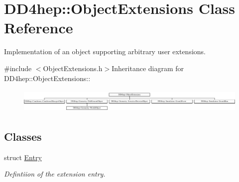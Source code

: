 \hypertarget{class_d_d4hep_1_1_object_extensions}{
\section{DD4hep::ObjectExtensions Class Reference}
\label{class_d_d4hep_1_1_object_extensions}
}


Implementation of an object supporting arbitrary user extensions.  


{\ttfamily \#include $<$ObjectExtensions.h$>$}Inheritance diagram for DD4hep::ObjectExtensions::\begin{figure}[H]
\begin{center}
\leavevmode
\includegraphics[height=1.1831cm]{class_d_d4hep_1_1_object_extensions}
\end{center}
\end{figure}
\subsection*{Classes}
\begin{DoxyCompactItemize}
\item 
struct \hyperlink{struct_d_d4hep_1_1_object_extensions_1_1_entry}{Entry}
\begin{DoxyCompactList}\small\item\em Defintiion of the extension entry. \item\end{DoxyCompactList}\end{DoxyCompactItemize}
